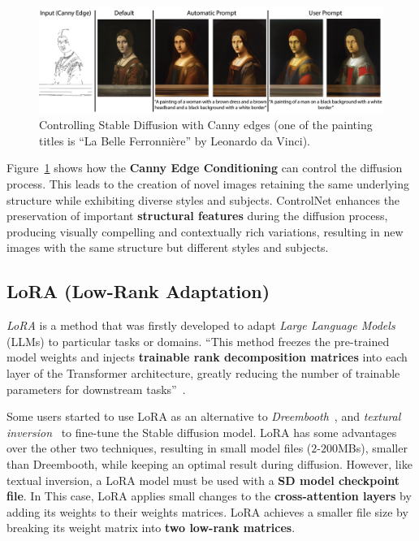 \documentclass[sn-mathphys,Numbered]{sn-jnl}
\theoremstyle{thmstyleone}%
\theoremstyle{thmstyletwo}%
\theoremstyle{thmstylethree}%
\begin{document}
\begin{figure}[t]
	\centering
	\includegraphics[scale=0.8]{img/background_img/ControlnetDemo.png}
	\caption{Controlling Stable Diffusion with Canny edges (one of the painting titles is ``La Belle Ferronni{\`e}re'' by Leonardo da Vinci).}
	\label{fig:canny}
\end{figure}

Figure~\ref{fig:canny} shows how the \textbf{Canny Edge Conditioning} can control the diffusion process.
This leads to the creation of novel images retaining the same underlying structure while exhibiting diverse styles and subjects.
ControlNet enhances the preservation of important \textbf{structural features} during the diffusion process, producing visually compelling and contextually rich variations, resulting in new images with the same structure but different styles and subjects.



\subsection{LoRA (Low-Rank Adaptation)}\label{sect:lora}

\emph{LoRA} \cite{hu2021lora} is a method that was firstly developed to adapt 
\emph{Large Language Models} (LLMs) to particular tasks or domains.
``This method freezes  the pre-trained model weights and injects \textbf{trainable rank decomposition matrices}  into each layer of the Transformer architecture, greatly reducing the number of trainable 
parameters for downstream tasks''~\cite{hu2021lora}.

Some users started to use LoRA as an alternative to \emph{Dreembooth}~\cite{ruiz2022dreambooth}, and \emph{textural inversion}~\cite{gal2022image} to  fine-tune the Stable diffusion model. LoRA has some advantages over the other two techniques, resulting in small model files ($2$-$200$MBs), smaller than Dreembooth,  while keeping an optimal result during diffusion. However, like textual inversion, a LoRA model must be used with a \textbf{SD model checkpoint file}. In This case, LoRA applies small changes to the \textbf{cross-attention layers} by adding its  weights to their weights matrices. LoRA achieves a smaller file size by breaking its weight matrix into \textbf{two low-rank matrices}.
\end{document}
